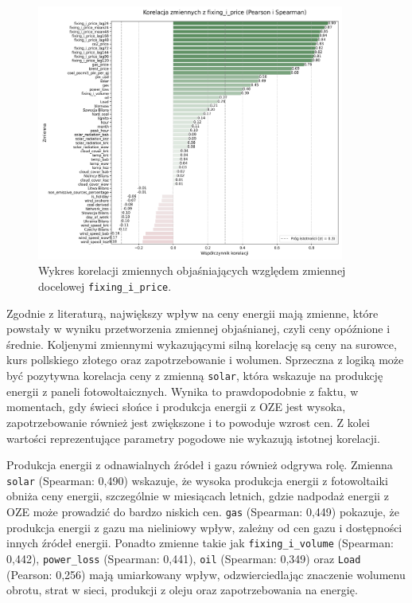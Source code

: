 \begin{figure}[H]
    \centering
    \includegraphics[width=0.9\textwidth]{../plots/correlation_with_fixing_i_price.png}
    \caption{Wykres korelacji zmiennych objaśniających względem zmiennej docelowej \texttt{fixing\_i\_price}.}
    \label{fig:correlation_plot}
\end{figure}

Zgodnie z literaturą, największy wpływ na ceny energii mają zmienne, które powstały w wyniku przetworzenia zmiennej objaśnianej, czyli ceny opóźnione i średnie. Koljenymi zmiennymi wykazującymi silną korelację są ceny na surowce, kurs pollskiego złotego oraz zapotrzebowanie i wolumen. Sprzeczna z logiką może być pozytywna korelacja ceny z zmienną \texttt{solar}, która wskazuje na produkcję energii z paneli fotowoltaicznych. Wynika to prawdopodobnie z faktu, w momentach, gdy świeci słońce i produkcja energii z OZE jest wysoka, zapotrzebowanie również jest zwiększone i to powoduje wzrost cen. Z kolei wartości reprezentujące parametry pogodowe nie wykazują istotnej korelacji. 

Produkcja energii z odnawialnych źródeł i gazu również odgrywa rolę. Zmienna \texttt{solar} (Spearman: 0,490) wskazuje, że wysoka produkcja energii z fotowoltaiki obniża ceny energii, szczególnie w miesiącach letnich, gdzie nadpodaż energii z OZE może prowadzić do bardzo niskich cen. \texttt{gas} (Spearman: 0,449) pokazuje, że produkcja energii z gazu ma nieliniowy wpływ, zależny od cen gazu i dostępności innych źródeł energii. Ponadto zmienne takie jak \texttt{fixing\_i\_volume} (Spearman: 0,442), \texttt{power\_loss} (Spearman: 0,441), \texttt{oil} (Spearman: 0,349) oraz \texttt{Load} (Pearson: 0,256) mają umiarkowany wpływ, odzwierciedlając znaczenie wolumenu obrotu, strat w sieci, produkcji z oleju oraz zapotrzebowania na energię.

